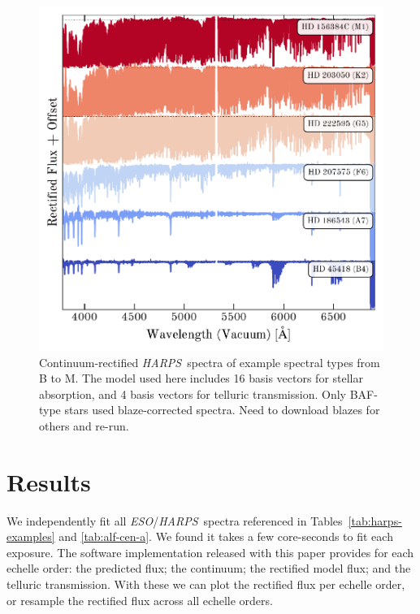 \documentclass[modern]{aastex631}
\newcommand{\project}[1]{\textit{#1}}
\newcommand{\eso}{\project{ESO}}
\newcommand{\harps}{\project{HARPS}}
\newcommand{\todo}[1]{\textcolor{tab:red}{#1}}
\begin{document}
\begin{figure}
    \includegraphics[width=\textwidth, height=\textwidth]{../code/harps_examples.pdf}
    \caption{Continuum-rectified \harps\ spectra of example spectral types from B to M. The model used here includes 16 basis vectors for stellar absorption, and 4 basis vectors for telluric transmission. \todo{Only BAF-type stars used blaze-corrected spectra. Need to download blazes for others and re-run.}\label{fig:harps-examples}}
\end{figure}


\section{Results} \label{sec:results}

We independently fit all \eso/\harps\ spectra referenced in Tables~\ref{tab:harps-examples} and \ref{tab:alf-cen-a}. We found it takes a few core-seconds to fit each exposure. The software implementation released with this paper provides for each echelle order: the predicted flux; the continuum; the rectified model flux; and the telluric transmission. With these we can plot the rectified flux per echelle order, or resample the rectified flux across all echelle orders.\\
\end{document}
